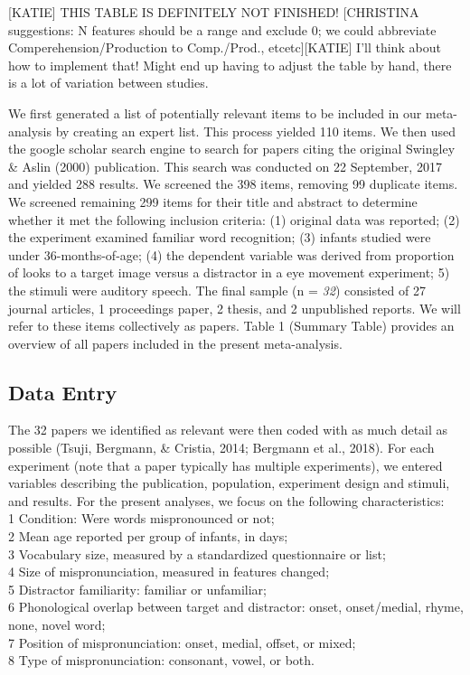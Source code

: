 \documentclass[man]{apa6}
\theoremstyle{definition}
\theoremstyle{definition}
\theoremstyle{definition}
\theoremstyle{remark}
\begin{document}
{[}KATIE{]} THIS TABLE IS DEFINITELY NOT FINISHED! {[}CHRISTINA
suggestions: N features should be a range and exclude 0; we could
abbreviate Comperehension/Production to Comp./Prod.,
etcetc{]}{[}KATIE{]} I'll think about how to implement that! Might end
up having to adjust the table by hand, there is a lot of variation
between studies.

We first generated a list of potentially relevant items to be included
in our meta-analysis by creating an expert list. This process yielded
110 items. We then used the google scholar search engine to search for
papers citing the original Swingley \& Aslin (2000) publication. This
search was conducted on 22 September, 2017 and yielded 288 results. We
screened the 398 items, removing 99 duplicate items. We screened
remaining 299 items for their title and abstract to determine whether it
met the following inclusion criteria: (1) original data was reported;
(2) the experiment examined familiar word recognition; (3) infants
studied were under 36-months-of-age; (4) the dependent variable was
derived from proportion of looks to a target image versus a distractor
in a eye movement experiment; 5) the stimuli were auditory speech. The
final sample (n = \emph{32}) consisted of 27 journal articles, 1
proceedings paper, 2 thesis, and 2 unpublished reports. We will refer to
these items collectively as papers. Table 1 (Summary Table) provides an
overview of all papers included in the present meta-analysis.

\subsection{Data Entry}\label{data-entry}

The 32 papers we identified as relevant were then coded with as much
detail as possible (Tsuji, Bergmann, \& Cristia, 2014; Bergmann et al.,
2018). For each experiment (note that a paper typically has multiple
experiments), we entered variables describing the publication,
population, experiment design and stimuli, and results. For the present
analyses, we focus on the following characteristics:\\
1 Condition: Were words mispronounced or not;\\
2 Mean age reported per group of infants, in days;\\
3 Vocabulary size, measured by a standardized questionnaire or list;\\
4 Size of mispronunciation, measured in features changed;\\
5 Distractor familiarity: familiar or unfamiliar;\\
6 Phonological overlap between target and distractor: onset,
onset/medial, rhyme, none, novel word;\\
7 Position of mispronunciation: onset, medial, offset, or mixed;\\
8 Type of mispronunciation: consonant, vowel, or both.
\end{document}
